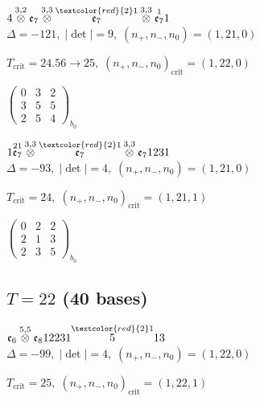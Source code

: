 \documentclass[10pt]{article}
\begin{document}
\smallskip

$4\overset{3,2}{\otimes}\mathfrak{e}_7\overset{3,3}{\otimes}\overset{\textcolor{red}{2}1}{\mathfrak{e}_7}\overset{3,3}{\otimes}\overset{1}{\mathfrak{e}_7}1$ \quad $\Delta=-121,\; |\det|=9,\; (n_+,n_-,n_0)=(1,21,0)$

\hspace{1em}$T_{\text{crit}}=24.56 \to 25,\; (n_+,n_-,n_0)_{\text{crit}}=(1,22,0)$

\hspace{2em}$\left(\begin{smallmatrix}0 & 3 & 2 \\ 3 & 5 & 5 \\ 2 & 5 & 4\end{smallmatrix}\right)_{\!b_0}$

\smallskip

$1\overset{21}{\mathfrak{e}_7}\overset{3,3}{\otimes}\overset{\textcolor{red}{2}1}{\mathfrak{e}_7}\overset{3,3}{\otimes}\mathfrak{e}_71231$ \quad $\Delta=-93,\; |\det|=4,\; (n_+,n_-,n_0)=(1,21,0)$

\hspace{1em}$T_{\text{crit}}=24,\; (n_+,n_-,n_0)_{\text{crit}}=(1,21,1)$

\hspace{2em}$\left(\begin{smallmatrix}0 & 2 & 2 \\ 2 & 1 & 3 \\ 2 & 3 & 5\end{smallmatrix}\right)_{\!b_0}$


\subsection*{$T = 22$ \quad (40 bases)}
\smallskip

$\mathfrak{e}_6\overset{5,5}{\otimes}\mathfrak{e}_812231\overset{\textcolor{red}{2}1}{5}13$ \quad $\Delta=-99,\; |\det|=4,\; (n_+,n_-,n_0)=(1,22,0)$

\hspace{1em}$T_{\text{crit}}=25,\; (n_+,n_-,n_0)_{\text{crit}}=(1,22,1)$
\end{document}
